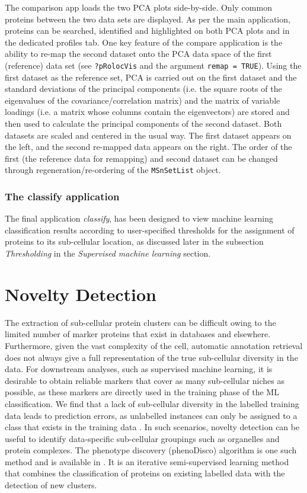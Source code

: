 The comparison app loads the two PCA plots side-by-side. Only common
proteins between the two data sets are displayed. As per the main
application, proteins can be searched, identified and highlighted on
both PCA plots and in the dedicated profiles tab. One key feature of
the compare application is the ability to re-map the second dataset
onto the PCA data space of the first (reference) data set (see
\texttt{?pRolocVis} and the argument \texttt{remap = TRUE}). Using the first dataset
as the reference set, PCA is carried out on the first dataset and the
standard deviations of the principal components (i.e. the square roots
of the eigenvalues of the covariance/correlation matrix) and the
matrix of variable loadings (i.e. a matrix whose columns contain the
eigenvectors) are stored and then used to calculate the principal
components of the second dataset. Both datasets are scaled and
centered in the usual way. The first dataset appears on the left, and
the second re-mapped data appears on the right. The order of the first
(the reference data for remapping) and second dataset can be changed
through regeneration/re-ordering of the \texttt{MSnSetList} object.

\subsubsection*{The classify application}
The final application \textit{classify}, has been designed to view
machine learning classification results according to user-specified
thresholds for the assignment of proteins to its sub-cellular
location, as discussed later in the subsection \textit{Thresholding}
in the \textit{Supervised machine learning} section.


\section*{Novelty Detection}

The extraction of sub-cellular protein clusters can be difficult owing
to the limited number of marker proteins that exist in databases and
elsewhere. Furthermore, given the vast complexity of the cell,
automatic annotation retrieval does not always give a full
representation of the true sub-cellular diversity in the data. For
downstream analyses, such as supervised machine learning, it is
desirable to obtain reliable markers that cover as many sub-cellular
niches as possible, as these markers are directly used in the training
phase of the ML classification. We find that a lack of sub-cellular
diversity in the labelled training data leads to prediction errors, as
unlabelled instances can only be assigned to a class that exists in
the training data \cite{Breckels:2013}. In such scenarios, novelty
detection can be useful to identify data-specific sub-cellular
groupings such as organelles and protein complexes. The phenotype
discovery (phenoDisco) algorithm \cite{Breckels:2013} is one such method
and is available in . It is an iterative
semi-supervised learning method that combines the classification of
proteins on existing labelled data with the detection of new clusters.

